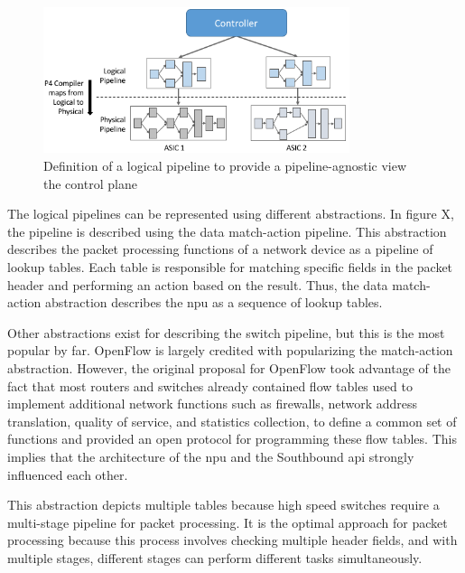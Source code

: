 \begin{figure}
	\centering
	\includegraphics[width=0.8\textwidth]{Chapters/Figures/SDNs/pipeline_abstraction.png}
	\caption{Definition of a logical pipeline to provide a pipeline-agnostic view the control plane\cite{peterson_software-defined_2021}}
	\label{fig:pipeline_abstraction}
\end{figure}


The logical pipelines can be represented using different abstractions. In figure X, the pipeline is described using the data match-action pipeline. This abstraction describes the packet processing functions of a network device as a pipeline of lookup tables. Each table is responsible for matching specific fields in the packet header and performing an action based on the result\cite{bifulco_survey_2018}\cite{kreutz_software-defined_2015}. Thus, the data match-action abstraction describes the \gls{npu} as a sequence of lookup tables. 

Other abstractions exist for describing the switch pipeline, but this is the most popular by far. OpenFlow is largely credited with popularizing the match-action abstraction\cite{bifulco_survey_2018}. However, the original proposal for OpenFlow took advantage of the fact that most routers and switches already contained flow tables used to implement additional network functions such as firewalls, network address translation, quality of service, and statistics collection, to define a common set of functions and provided an open protocol for programming these flow tables\cite{mckeown_openflow_2008}. This implies that the architecture of the \gls{npu} and the Southbound \gls{api} strongly influenced each other.

This abstraction depicts multiple tables because high speed switches require a multi-stage pipeline for packet processing. It is the optimal approach for packet processing because this process involves checking multiple header fields, and with multiple stages, different stages can perform different tasks simultaneously\cite{peterson_software-defined_2021}. 

